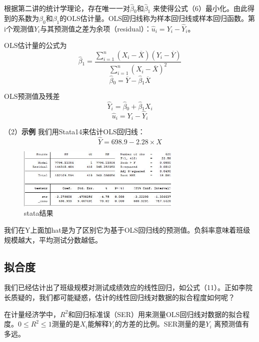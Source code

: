\documentclass[cn,12pt,math=newtx,citestyle=gb7714-2015,bibstyle=gb7714-2015]{elegantbook}
\begin{document}
	根据第二讲的统计学理论，存在唯一一对$\hat\beta{_0}$和$\hat\beta{_1}$ 来使得公式（6）最小化。由此得到的系数为$\beta_0$和$\beta_1$的OLS估计量。OLS回归线称为样本回归线或样本回归函数。第i个观测值$Y_i$与其预测值之差为余项（residual）：$\hat{u}_i=Y_i-\hat{Y}_i$。
	
	OLS估计量的公式为
	\begin{equation}
		\hat\beta{_1}=\frac{\sum_{i=1}^n{(X_i-\overline{X})(Y_i-\overline{Y})}}{\sum_{i=1}^n{(X_i-\overline{X})^2}}
	\end{equation}
	\begin{equation}
		\hat\beta{_0}=\overline{Y}-\hat\beta{_1}\overline{X}
	\end{equation}
	
	OLS预测值及残差
	\begin{equation}
		\hat{Y}_i=\hat\beta{_0}+\hat\beta{_1}X_i
	\end{equation}
	\begin{equation}
		\hat{u}_i=Y_i-\hat{Y}_i
	\end{equation}
	
	（2）\textbf{示例}
	我们用Stata14来估计OLS回归线：
	\begin{equation}
		\hat{Y}=698.9-2.28\times{X}
	\end{equation}
	\begin{figure}[htbp]
		\centering
		\includegraphics[width=0.7\textwidth]{stata1.jpg}
		\caption{stata结果}\label{fig:digit}
	\end{figure}
	
	我们在Y上面加hat是为了区别它为基于OLS回归线的预测值。负斜率意味着班级规模越大，平均测试分数越低。
	\subsection{拟合度}
	我们已经估计出了班级规模对测试成绩效应的线性回归，如公式（11）。正如李院长质疑的，我们都可能疑惑，估计的线性回归线对数据的拟合程度如何呢？
	
	在计量经济学中，$R^2$和回归标准误（SER）用来测量OLS回归线对数据的拟合程度。$0\leq{R^2}\leq1$测量的是$X_i$能解释$Y_i$的方差的比例。SER测量的是$Y_i$ 离预测值有多远。
	
\end{document}
